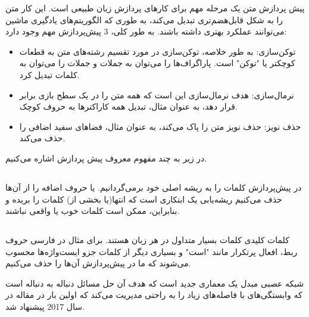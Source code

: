 پیش پردازش متن یک مرحله مهم برای کارهای پردازش زبان طبیعی است. این کار متن را به شکل قابل‌هضم‌تری تبدیل می‌کند، به طوری که الگوریتم‌های یادگیری ماشین می‌توانند عملکرد بهتری داشته باشند.
به طور کلی، 3 پیش‌پردازش مهم وجود دارد:
\begin{itemize}
\item  توکن‌سازی: به طور خلاصه، توکن‌سازی در مورد تقسیم رشته‌های متن به قطعات کوچکتر یا "توکن" است. پاراگراف‌ها را می‌توان به جملات و جملات را می‌توان به کلمات تبدیل کرد.
\item نرمال‌سازی: هدف نرمال‌سازی این است که همه متن را در یک سطح بازی برابر قرار دهد، به عنوان مثال، تبدیل همه کاراکترها به حروف کوچک. 
\item حذف نویز: حذف نویز متن را پاک می‌کند، به عنوان مثال، فضاهای سفید اضافی را حذف می‌کند.
\end{itemize}


در زیر به چند مفهوم معروف پیش پردازش اشاره می‌کنیم.
\subsection{}
در پیش‌پردازش کلمات را به ریشه اصلی خود برمی‌گردانیم. یا حروف اضافه را از آن‌ها حذف می‌کنیم 
ریشه‌یابی یک ابتکاری است که انتها(یا بخشی از) کلمات را بریده و بنابراین، ممکن است کلمات خوب یا واقعی نباشند.


\subsection{}
کلمات کلیدی کلمات بسیار متداول در هر زبان هستند. برای مثال در فارسی حروف ربط، افعال پرتکرار مانند 
"است"
و بسیاری دیگر از کلمات جزو ایست‌واژه‌ها محسوب می‌شوند که ما در پیش‌پردازش آن‌ها را حذف می‌کنیم.

شبکه عصبی مبدل یک معماری جدید است که هدف آن حل مسائل دنباله به دنباله است که وابستگی‌های با فاصله‌های زیاد را به راحتی مدیریت می‌کند که اولین بار در مقاله 
\cite{Ashish2017Attention}
در سال 2017 پیشنهاد شد.
